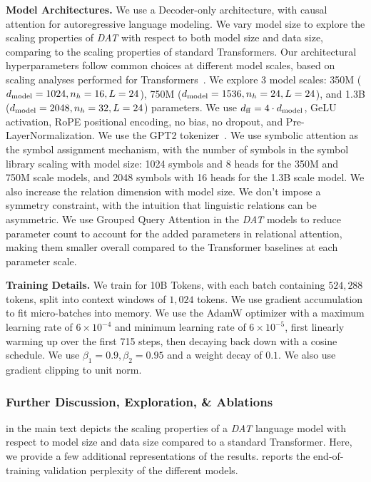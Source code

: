 \textbf{Model Architectures.} We use a Decoder-only architecture, with causal attention for autoregressive language modeling. We vary model size to explore the scaling properties of \textit{DAT} with respect to both model size and data size, comparing to the scaling properties of standard Transformers. Our architectural hyperparameters follow common choices at different model scales, based on scaling analyses performed for Transformers~\citep{penedo2024finewebdatasetsdecantingweb}. We explore 3 model scales: 350M ($d_{\mathrm{model}} = 1024, n_h = 16, L = 24$), 750M ($d_{\mathrm{model}} = 1536, n_h = 24, L = 24$), and 1.3B ($d_{\mathrm{model}} = 2048, n_h = 32, L = 24$) parameters. We use $d_{\mathrm{ff}} = 4 \cdot d_{\mathrm{model}}$, GeLU activation, RoPE positional encoding, no bias, no dropout, and Pre-LayerNormalization. We use the GPT2 tokenizer~\citep{radford2019language}. We use symbolic attention as the symbol assignment mechanism, with the number of symbols in the symbol library scaling with model size: 1024 symbols and 8 heads for the 350M and 750M scale models, and 2048 symbols with 16 heads for the 1.3B scale model. We also increase the relation dimension with model size. We don't impose a symmetry constraint, with the intuition that linguistic relations can be asymmetric. We use Grouped Query Attention in the \textit{DAT} models to reduce parameter count to account for the added parameters in relational attention, making them smaller overall compared to the Transformer baselines at each parameter scale.

\textbf{Training Details.} We train for 10B Tokens, with each batch containing $524,288$ tokens, split into context windows of $1,024$ tokens. We use gradient accumulation to fit micro-batches into memory. We use the AdamW optimizer with a maximum learning rate of $6 \times 10^{-4}$ and minimum learning rate of $6 \times 10^{-5}$, first linearly warming up over the first 715 steps, then decaying back down with a cosine schedule. We use $\beta_1 = 0.9, \beta_2 = 0.95$ and a weight decay of $0.1$. We also use gradient clipping to unit norm.

\subsubsection*{Further Discussion, Exploration, \& Ablations}

 in the main text depicts the scaling properties of a \textit{DAT} language model with respect to model size and data size compared to a standard Transformer. Here, we provide a few additional representations of the results.  reports the end-of-training validation perplexity of the different models. 

